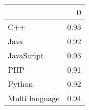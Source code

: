 \begin{tabular}{lr}
\toprule
{} &    0 \\
\midrule
C++            & 0.93 \\
Java           & 0.92 \\
JavaScript     & 0.93 \\
PHP            & 0.91 \\
Python         & 0.92 \\
Multi language & 0.94 \\
\bottomrule
\end{tabular}

